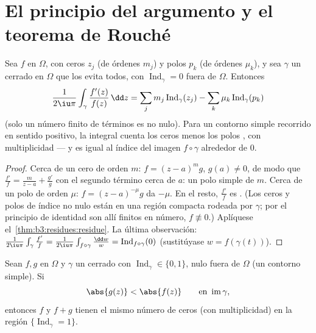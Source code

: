 \section{El principio del argumento y el teorema de Rouché}

\begin{theorem}
\label{thm:b3:residues:argument}
Sea $f$  en $\Omega$,
con ceros $z_j$ (de órdenes $m_j$) y polos $p_k$ (de órdenes $\mu_k$), y
sea $\gamma$ un  cerrado
en $\Omega$ que los evita todos, con $\operatorname{Ind}_\gamma = 0$
fuera de $\Omega$. Entonces 
\[
\frac1{2\iu\pi}\int_\gamma\frac{f'(z)}{f(z)}\,\dd z
= \sum_j m_j\operatorname{Ind}_\gamma(z_j)
- \sum_k \mu_k\operatorname{Ind}_\gamma(p_k)
\]
(solo un número finito de términos es no nulo). Para un contorno simple
recorrido en sentido positivo, la integral cuenta los ceros menos los
polos , con multiplicidad --- y es igual al índice del
 imagen $f\circ\gamma$
alrededor de $0$.
\end{theorem}

\begin{proof}
Cerca de un cero de orden $m$: $f = (z-a)^mg$, $g(a) \neq 0$, de modo
que $\frac{f'}f = \frac m{z - a} + \frac{g'}g$ con el segundo término
 cerca de $a$: un polo simple
de  $m$. Cerca de un polo
de orden $\mu$: $f = (z-a)^{-\mu}g$ da
 $-\mu$. En el resto,
$\frac{f'}f$ es . (Los ceros
y polos de índice no nulo están en una región
compacta rodeada por $\gamma$; por el
principio de identidad son allí finitos en número, $f \not\equiv 0$.)
Aplíquese el~\cref{thm:b3:residues:residue}. La última observación:
$\frac1{2\iu\pi}\int_\gamma\frac{f'}f =
\frac1{2\iu\pi}\int_{f\circ\gamma}\frac{\dd w}w =
\operatorname{Ind}_{f\circ\gamma}(0)$ (sustitúyase $w =
f(\gamma(t))$).
\end{proof}

\begin{theorem}[Rouché]\label{thm:b3:residues:rouche}
Sean $f, g$  en $\Omega$ y
$\gamma$ un  cerrado con
$\operatorname{Ind}_\gamma \in \{0,1\}$, nulo fuera de $\Omega$ (un
contorno simple). Si
\[
\abs{g(z)} < \abs{f(z)} \qquad \text{en }
\operatorname{im}\gamma,
\]
entonces $f$ y $f + g$ tienen el mismo número de ceros (con
multiplicidad) en la región $\{\operatorname{Ind}_\gamma =
1\}$.
\end{theorem}

